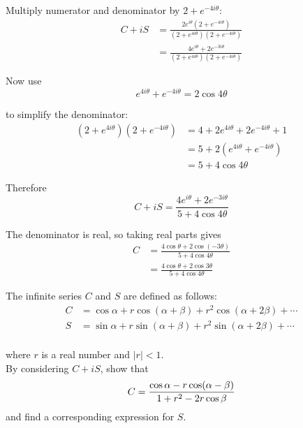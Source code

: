 \documentclass[leqno]{article}
\begin{document}
\begin{enumerate}[
  label=\textbf{\arabic*.},
  leftmargin=*,
  topsep=0pt,
  partopsep=0pt,
  parsep=0pt
]
\begin{djsSolution}
\begin{enumerate}[label=\textbf{(\alph*)}]
Multiply numerator and denominator by \(2+e^{-4i\theta}\):
\begin{align*}
C+iS
&=\frac{2e^{i\theta}(2+e^{-4i\theta})}{(2+e^{4i\theta})(2+e^{-4i\theta})}\\
&=\frac{4e^{i\theta}+2e^{-3i\theta}}{(2+e^{4i\theta})(2+e^{-4i\theta})}
\end{align*}

Now use
\[
e^{4i\theta}+e^{-4i\theta}=2\cos 4\theta
\]

to simplify the denominator:
\begin{align*}
(2+e^{4i\theta})(2+e^{-4i\theta})
&=4+2e^{4i\theta}+2e^{-4i\theta}+1\\
&=5+2\left(e^{4i\theta}+e^{-4i\theta}\right)\\
&=5+4\cos 4\theta
\end{align*}

Therefore
\[
C+iS=\frac{4e^{i\theta}+2e^{-3i\theta}}{5+4\cos 4\theta}
\]

The denominator is real, so taking real parts gives
\begin{align*}
C
&=\frac{4\cos\theta+2\cos(-3\theta)}{5+4\cos4\theta}\\
&=\frac{4\cos\theta+2\cos3\theta}{5+4\cos4\theta}
\end{align*}
\end{enumerate}
\end{djsSolution}


\newpage

\questionitem

The infinite series $C$ and $S$ are defined as follows: \\
\begin{align*}
C&= \cos\alpha + r\cos(\alpha + \beta) + r^2\cos(\alpha + 2\beta) + \cdots \\[10pt]
S &= \sin\alpha + r\sin(\alpha + \beta) + r^2\sin(\alpha + 2\beta) + \cdots \\
\end{align*}

where $r$ is a real number and $|r| < 1$. \\


By considering $C+ iS$, show that \\
\[
C= \frac{\cos\alpha - r\cos(\alpha - \beta)}{1 + r^2 - 2r\cos\beta} \\
\] 
and find a corresponding expression for $S$. 

\vspace*{10pt}


\end{enumerate}
\end{document}
